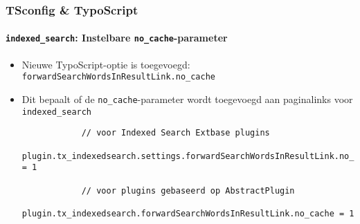 \begin{frame}[fragile]
	\frametitle{TSconfig \& TypoScript}
	\framesubtitle{\texttt{indexed\_search}: Instelbare \texttt{no\_cache}-parameter}

	\lstset{basicstyle=\tiny\ttfamily}

	\begin{itemize}

		\item Nieuwe TypoScript-optie is toegevoegd:\newline
			 \texttt{forwardSearchWordsInResultLink.no\_cache}

		\item Dit bepaalt of de \texttt{no\_cache}-parameter wordt toegevoegd aan paginalinks
			voor \texttt{indexed\_search}

		\begin{lstlisting}
			// voor Indexed Search Extbase plugins
			plugin.tx_indexedsearch.settings.forwardSearchWordsInResultLink.no_cache = 1

			// voor plugins gebaseerd op AbstractPlugin
			plugin.tx_indexedsearch.forwardSearchWordsInResultLink.no_cache = 1
		\end{lstlisting}

	\end{itemize}

\end{frame}

